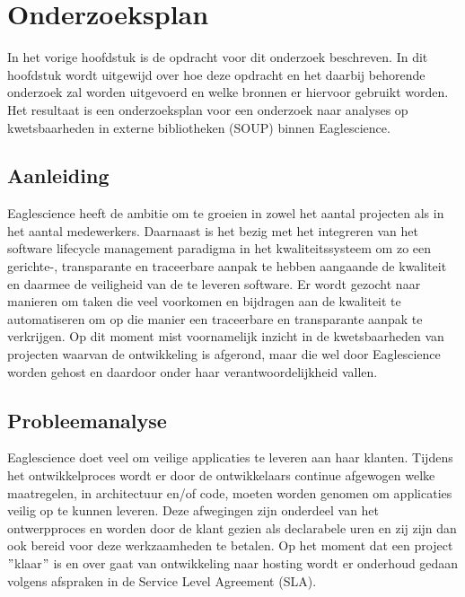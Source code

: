 \chapter{Onderzoeksplan}\label{ch:onderzoekPlan}

In het vorige hoofdstuk is de opdracht voor dit onderzoek beschreven. In dit hoofdstuk wordt uitgewijd over hoe deze opdracht en het daarbij behorende onderzoek zal worden uitgevoerd en welke bronnen er hiervoor gebruikt worden. Het resultaat is een onderzoeksplan voor een onderzoek naar analyses op kwetsbaarheden in externe bibliotheken (SOUP) binnen Eaglescience.


\section{Aanleiding}\label{sec:OP_aanleiding}
Eaglescience heeft de ambitie om te groeien in zowel het aantal projecten als in het aantal medewerkers. Daarnaast is het bezig met het integreren van het software lifecycle management paradigma in het kwaliteitssysteem om zo een gerichte-, transparante en traceerbare aanpak te hebben aangaande de kwaliteit en daarmee de veiligheid van de te leveren software. Er wordt gezocht naar manieren om taken die veel voorkomen en bijdragen aan de kwaliteit te automatiseren om op die manier een traceerbare en transparante aanpak te verkrijgen. Op dit moment mist voornamelijk inzicht in de kwetsbaarheden van projecten waarvan de ontwikkeling is afgerond, maar die wel door Eaglescience worden gehost en daardoor onder haar verantwoordelijkheid vallen.


\section{Probleemanalyse}\label{sec:probleemanalyse}
Eaglescience doet veel om veilige applicaties te leveren aan haar klanten. Tijdens het ontwikkelproces wordt er door de ontwikkelaars continue afgewogen welke maatregelen, in architectuur en/of code, moeten worden genomen om applicaties veilig op te kunnen leveren. Deze afwegingen zijn onderdeel van het ontwerpproces en worden door de klant gezien als declarabele uren en zij zijn dan ook bereid voor deze werkzaamheden te betalen. Op het moment dat een project $"$klaar$"$ is en over gaat van ontwikkeling naar hosting wordt er onderhoud gedaan volgens afspraken in de Service Level Agreement (SLA).


